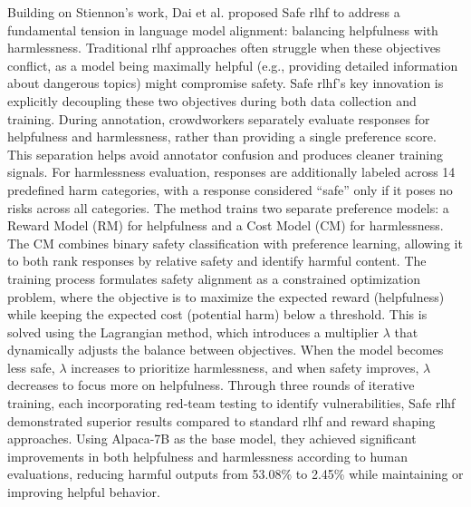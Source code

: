 Building on Stiennon's work, Dai et al. \cite{dai2023saferlhfsafereinforcement} proposed Safe \gls{rlhf} to address a fundamental tension in language model alignment: balancing helpfulness with harmlessness. 
Traditional \gls{rlhf} approaches often struggle when these objectives conflict, as a model being maximally helpful (e.g., providing detailed information about dangerous topics) might compromise safety.
Safe \gls{rlhf}'s key innovation is explicitly decoupling these two objectives during both data collection and training. 
During annotation, crowdworkers separately evaluate responses for helpfulness and harmlessness, rather than providing a single preference score. 
This separation helps avoid annotator confusion and produces cleaner training signals. 
For harmlessness evaluation, responses are additionally labeled across 14 predefined harm categories, with a response considered ``safe'' only if it poses no risks across all categories.
The method trains two separate preference models: a Reward Model (RM) for helpfulness and a Cost Model (CM) for harmlessness. 
The CM combines binary safety classification with preference learning, allowing it to both rank responses by relative safety and identify harmful content. 
The training process formulates safety alignment as a constrained optimization problem, where the objective is to maximize the expected reward (helpfulness) while keeping the expected cost (potential harm) below a threshold. 
This is solved using the Lagrangian method, which introduces a multiplier $\lambda$ that dynamically adjusts the balance between objectives. 
When the model becomes less safe, $\lambda$ increases to prioritize harmlessness, and when safety improves, $\lambda$ decreases to focus more on helpfulness.
Through three rounds of iterative training, each incorporating red-team testing to identify vulnerabilities, Safe \gls{rlhf} demonstrated superior results compared to standard \gls{rlhf} and reward shaping approaches. 
Using Alpaca-7B as the base model, they achieved significant improvements in both helpfulness and harmlessness according to human evaluations, reducing harmful outputs from 53.08\% to 2.45\% while maintaining or improving helpful behavior.

